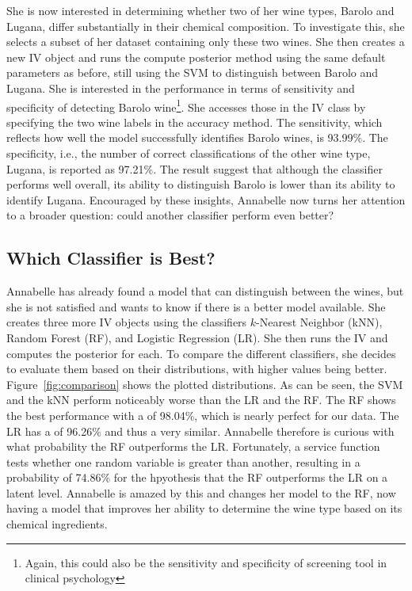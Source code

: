 \documentclass[man]{apa7}
\begin{document}
She is now interested in determining whether two of her wine types, Barolo and Lugana, differ substantially in their chemical composition.
To investigate this, she selects a subset of her dataset containing only these two wines.
She then creates a new IV object and runs the compute posterior method using the same default parameters as before, still using the SVM to distinguish between Barolo and Lugana.
She is interested in the performance in terms of sensitivity and specificity of detecting Barolo wine\footnote{Again, this could also be the sensitivity and specificity of screening tool in clinical psychology}.
She accesses those in the IV class by specifying the two wine labels in the accuracy method.
The sensitivity, which reflects how well the model successfully identifies Barolo wines, is 93.99\%. The specificity, i.e., the number of correct classifications of the other wine type, Lugana, is reported as 97.21\%.
The result suggest that although the classifier performs well overall, its ability to distinguish Barolo is lower than its ability to identify Lugana.
Encouraged by these insights, Annabelle now turns her attention to a broader question: could another classifier perform even better?

\subsection{Which Classifier is Best?} \label{sec:ex_classifier_best}

Annabelle has already found a model that can distinguish between the wines, but she is not satisfied and wants to know if there is a better model available.
She creates three more IV objects using the classifiers $k$-Nearest Neighbor (kNN), Random Forest (RF), and Logistic Regression (LR).
She then runs the IV and computes the posterior for each.
To compare the different classifiers, she decides to evaluate them based on their  distributions, with higher values being better.
Figure~\ref{fig:comparison} shows the plotted distributions.
As can be seen, the SVM and the kNN perform noticeably worse than the LR and the RF.
The RF shows the best performance with a  of 98.04\%, which is nearly perfect for our data.
The LR has a  of 96.26\% and thus a very similar. Annabelle therefore is curious with what probability the RF outperforms the LR.
Fortunately, a service function tests whether one random variable is greater than another, resulting in a probability of 74.86\% for the hpyothesis that the RF outperforms the LR on a latent level.
Annabelle is amazed by this and changes her model to the RF, now having a model that improves her ability to determine the wine type based on its chemical ingredients.
\end{document}
